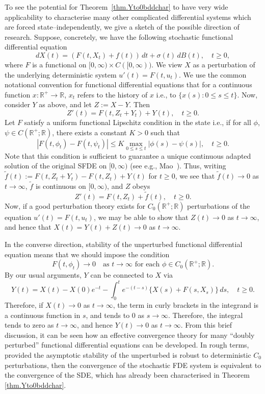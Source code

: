 \documentclass[a4paper,10pt,reqno]{amsart}
\numberwithin{equation}{section}
\theoremstyle{definition}
\theoremstyle{remark}
\DeclareMathOperator{\1}{\mathbbm 1}
\begin{document}
To see the potential for Theorem~\ref{thm.Yto0bddchar} to have very wide applicability to characterise many other complicated differential systems which are forced state--independently, we give a sketch of the possible direction of research. Suppose, concretely, we have the following stochastic functional differential equation
\[
dX(t)=(F(t,X_t)+f(t))\,dt + \sigma(t)\,dB(t), \quad t\geq 0,
\]    
where $F$ is a functional on $[0,\infty)\times C([0,\infty))$. We view $X$ as a perturbation of the underlying deterministic system $u'(t)=F(t,u_t)$. We use the common notational convention for functional differential equations that for a continuous function $x:\mathbb{R}^+\to \mathbb{R}$, $x_t$ refers to the history of $x$ i.e., to $\{x(s):0\leq s\leq t\}$. Now, consider $Y$ as above, and let $Z:=X-Y$. Then 
\[
Z'(t)=F(t,Z_t+Y_t)+Y(t), \quad t\geq 0.
\]  
Let $F$ satisfy a uniform functional Lipschitz condition in the state i.e., if   for all $\phi$, $\psi\in C(\mathbb{R}^+;\mathbb{R})$, there exists a constant $K>0$ such that 
\[
|F(t,\phi_t)-F(t,\psi_t)|\leq K\max_{0\leq s\leq t}|\phi(s)-\psi(s)|, \quad t\geq 0.
\]
Note that this condition is sufficient to guarantee a unique continuous adapted solution of the original SFDE on $[0,\infty)$ (see e.g., Mao~\cite{MaoBK}). 
Thus, writing $\tilde{f}(t):=F(t,Z_t+Y_t)-F(t,Z_t)+Y(t)$ for $t\geq 0$, we see that $\tilde{f}(t)\to 0$ as $t\to\infty$, $\tilde{f}$ is continuous on $[0,\infty)$, and $Z$ obeys 
\[
Z'(t)=F(t,Z_t)+\tilde{f}(t), \quad t\geq 0.
\] 
Now, if a good perturbation theory exists for $C_0(\mathbb{R}^+;\mathbb{R})$ perturbations of the equation $u'(t)=F(t,u_t)$, we may be able to show that $Z(t)\to 0$ as $t\to\infty$, and hence that $X(t)=Y(t)+Z(t)\to 0$ as $t\to\infty$. 

In the converse direction, stability of the unperturbed functional differential equation means that we should impose the condition 
\[
F(t,\phi_t)\to 0 \quad \text{as $t\to\infty$ for each $\phi\in C_0(\mathbb{R}^+;\mathbb{R})$}.
\]
By our usual arguments, $Y$ can be connected to $X$ via
\[
Y(t)=X(t)-X(0)e^{-t}-\int_{0}^t e^{-(t-s)}\{X(s)+F(s,X_s)\}\,ds, \quad t\geq 0.
\]
Therefore, if $X(t)\to 0$ as $t\to\infty$, the term in curly brackets in the integrand is a continuous function in $s$, and tends to $0$ as $s\to\infty$. Therefore, the integral tends to zero as $t\to\infty$, and hence $Y(t)\to 0$ as $t\to\infty$. From this brief discussion, it can be seen how an effective convergence theory for many ``doubly perturbed'' functional differential equations can be developed. In rough terms, provided the asymptotic stability of the unperturbed is robust to deterministic $C_0$ perturbations, then the convergence of the stochastic FDE system is equivalent to the convergence of the SDE, which has already been characterised in Theorem \ref{thm.Yto0bddchar}. 
\end{document}
